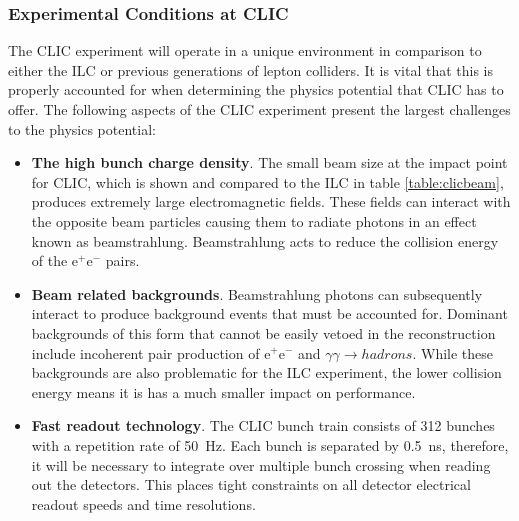 
\subsubsection{Experimental Conditions at CLIC}
The CLIC experiment will operate in a unique environment in comparison to either the ILC or previous generations of lepton colliders.  It is vital that this is properly accounted for when determining the physics potential that CLIC has to offer.  The following aspects of the CLIC experiment present the largest challenges to the physics potential:

\begin{itemize}
\item \textbf{The high bunch charge density}.  The small beam size at the impact point for CLIC{, which is shown and compared to the ILC in table \ref{table:clicbeam},} produces {extremely} large electromagnetic fields.  These fields can interact with the opposite beam particles causing them to radiate photons in an effect known as beamstrahlung.  Beamstrahlung acts to reduce the collision energy of the $\text{e}^{+}\text{e}^{-}$ pairs.   
\item \textbf{Beam related backgrounds}.  Beamstrahlung photons can subsequently interact to produce background events that must be accounted for.  Dominant backgrounds of this form that cannot be easily vetoed in the reconstruction include incoherent pair production of $\text{e}^{+}\text{e}^{-}$ and $\gamma\gamma \rightarrow hadrons$.  While these backgrounds are also problematic for the ILC experiment, the lower collision energy means it is has a much smaller impact on performance.
\item \textbf{Fast readout technology}.  The CLIC bunch train consists of 312 bunches with a repetition rate of 50~Hz.  Each bunch is separated by 0.5~ns, therefore, it will be necessary to integrate over multiple bunch crossing when reading out the detectors.  This places tight constraints on all detector electrical readout speeds and time resolutions.   
\end{itemize}

